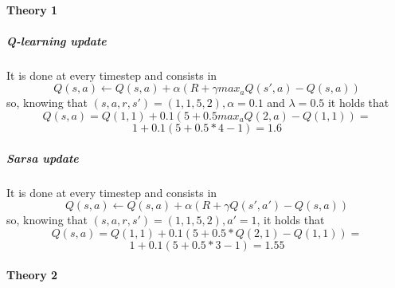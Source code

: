 \documentclass[12pt,a4paper]{extarticle}
\begin{document}
\paragraph{Theory 1}

\subparagraph{Q-learning update} It is done at every timestep and consists in \[Q(s,a) \leftarrow Q(s,a) + \alpha(R + \gamma max_aQ(s',a) - Q(s,a))\] so, knowing that $(s,a,r,s') = (1,1,5,2), \alpha = 0.1$ and $\lambda = 0.5$ it holds that \[Q(s,a) = Q(1,1) + 0.1(5 + 0.5max_aQ(2,a)-Q(1,1)) = \] \[1 + 0.1(5+ 0.5*4 - 1) = 1.6\]

\subparagraph{Sarsa update} It is done at every timestep and consists in \[Q(s,a) \leftarrow Q(s,a) + \alpha(R + \gamma Q(s',a') - Q(s,a))\] so, knowing that $(s,a,r,s') = (1,1,5,2), a'=1$, it holds that \[Q(s,a) = Q(1,1) + 0.1(5 + 0.5*Q(2,1)-Q(1,1)) = \] \[1 + 0.1(5+ 0.5*3 - 1) = 1.55\]

\paragraph{Theory 2}
\end{document}
